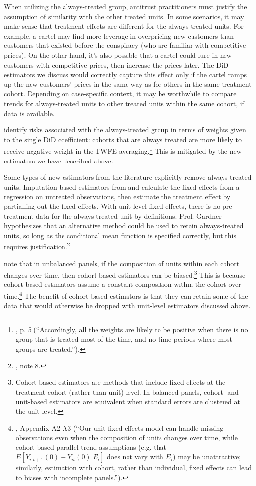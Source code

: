 \documentclass[12pt]{article}
\begin{document}
When utilizing the always-treated group, antitrust practitioners must justify the assumption of similarity with the other treated units. In some scenarios, it may make sense that treatment effects are different for the always-treated units. For example, a cartel may find more leverage in overpricing new customers than customers that existed before the conspiracy (who are familiar with competitive prices). On the other hand, it’s also possible that a cartel could lure in new customers with competitive prices, then increase the prices later. The DiD estimators we discuss would correctly capture this effect only if the cartel ramps up the new customers’ prices in the same way as for others in the same treatment cohort. Depending on case-specific context, it may be worthwhile to compare trends for always-treated units to other treated units within the same cohort, if data is available.

\citet{de2023two} identify risks associated with the always-treated group in terms of weights given to the single DiD coefficient: cohorts that are always treated are more likely to receive negative weight in the TWFE averaging.\footnote{\citet{de2023two}, p. 5 (“Accordingly, all the weights are likely to be positive when there is no group that is treated most of the time, and no time periods where most groups are treated.”).}  This is mitigated by the new estimators we have described above.

Some types of new estimators from the literature explicitly remove always-treated units. Imputation-based estimators from \citet{borusyak2024revisiting} and \citet{gardner2022a} calculate the fixed effects from a regression on untreated observations, then estimate the treatment effect by partialling out the fixed effects. With unit-level fixed effects, there is no pre-treatment data for the always-treated unit by definitions. Prof. Gardner hypothesizes that an alternative method could be used to retain always-treated units, so long as the conditional mean function is specified correctly, but this requires justification.\footnote{\citet{gardner2022a}, note 8.}

\citet{borusyak2024revisiting} note that in unbalanced panels, if the composition of units within each cohort changes over time, then cohort-based estimators can be biased.\footnote{Cohort-based estimators are methods that include fixed effects at the treatment cohort (rather than unit) level. In balanced panels, cohort- and unit-based estimators are equivalent when standard errors are clustered at the unit level.}  This is because cohort-based estimators assume a constant composition within the cohort over time.\footnote{\citet{borusyak2024revisiting}, Appendix A2-A3 (“Our unit fixed-effects model can handle missing observations even when the composition of units changes over time, while cohort-based parallel trend assumptions (e.g. that $E[Y_{i,t+1}(0) - Y_{it}(0) | E_i]$ does not vary with $E_i$) may be unattractive; similarly, estimation with cohort, rather than individual, fixed effects can lead to biases with incomplete panels.”).}  The benefit of cohort-based estimators is that they can retain some of the data that would otherwise be dropped with unit-level estimators discussed above.
\end{document}
